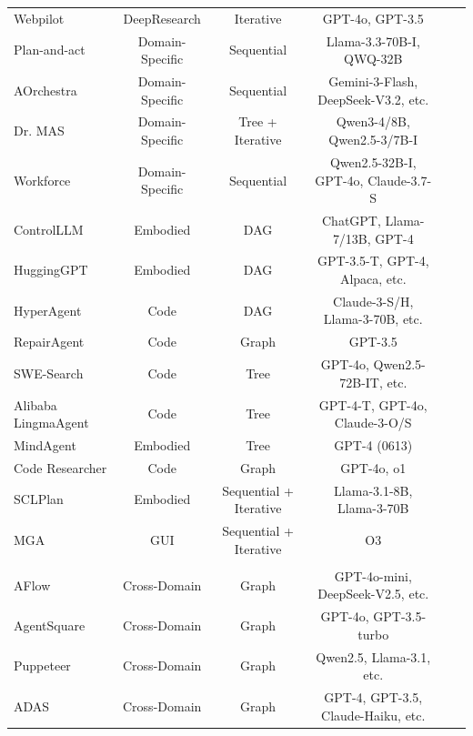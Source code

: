 \documentclass{llmxive}
\providecommand{\Yes}{\ding{51}}
\providecommand{\No}{\ding{55}}
\begin{document}
\begin{table}[htbp]
{\begin{tabular}{lccccc}
Webpilot \cite{Webpilot} & DeepResearch & Iterative & GPT-4o, GPT-3.5 & \No & \Yes \\
Plan-and-act \cite{PLAN_AND_ACT} & Domain-Specific & Sequential & Llama-3.3-70B-I, QWQ-32B & \Yes & \Yes \\
AOrchestra \cite{AORCHESTRA} & Domain-Specific & Sequential & Gemini-3-Flash, DeepSeek-V3.2, etc. & \Yes & \Yes \\
Dr. MAS \cite{Dr_MAS} & Domain-Specific & Tree + Iterative & Qwen3-4/8B, Qwen2.5-3/7B-I & \Yes & \Yes \\
Workforce \cite{OWL} & Domain-Specific & Sequential & Qwen2.5-32B-I, GPT-4o, Claude-3.7-S & \Yes & \Yes \\
ControlLLM \cite{ControlLLM} & Embodied & DAG & ChatGPT, Llama-7/13B, GPT-4 & \Yes & \No \\
HuggingGPT \cite{HuggingGPT} & Embodied & DAG & GPT-3.5-T, GPT-4, Alpaca, etc. & \No & \No \\
HyperAgent \cite{HYPERAGENT} & Code & DAG & Claude-3-S/H, Llama-3-70B, etc. & \Yes & \No \\
RepairAgent \cite{RepairAgent} & Code & Graph & GPT-3.5 & \No & \No \\
SWE-Search \cite{SWE_Search} & Code & Tree & GPT-4o, Qwen2.5-72B-IT, etc. & \Yes & \No \\
Alibaba LingmaAgent \cite{Alibaba_LingmaAgent} & Code & Tree & GPT-4-T, GPT-4o, Claude-3-O/S & \No & \No \\
MindAgent \cite{MINDAGENT} & Embodied & Tree & GPT-4 (0613) & \No & \Yes \\
Code Researcher \cite{Code_Researcher} & Code & Graph & GPT-4o, o1 & \No & \No \\
SCLPlan \cite{SCLPlan} & Embodied & Sequential + Iterative & Llama-3.1-8B, Llama-3-70B & \No & \No \\
MGA \cite{MGA} & GUI & Sequential + Iterative & O3 & \Yes & \Yes \\
\midrule
\rowcolor{gray!10!white} 
\multicolumn{6}{c}{\textbf{\textit{Evolving Workflow (\cref{sec:evolving_workflow})}}} \\
AFlow \cite{AFlow} & Cross-Domain & Graph & GPT-4o-mini, DeepSeek-V2.5, etc. & \No & \No \\
AgentSquare \cite{AgentSquare} & Cross-Domain & Graph & GPT-4o, GPT-3.5-turbo & \No & \No \\
Puppeteer \cite{Puppeteer} & Cross-Domain & Graph & Qwen2.5, Llama-3.1, etc. & \No & \Yes \\
ADAS \cite{ADAS} & Cross-Domain & Graph & GPT-4, GPT-3.5, Claude-Haiku, etc. & \No & \No \\

\end{tabular}}
\end{table}
\end{document}

